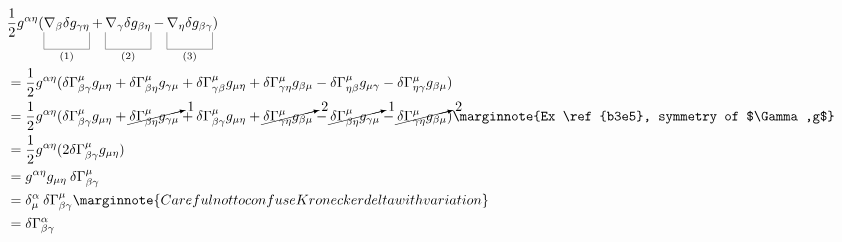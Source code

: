 \documentclass[10pt]{article}
\begin{document}
$$
\begin{aligned}
	&\frac12 g^{\alpha\eta}(\ub{\nabla_\beta \delta g_{\gamma\eta}}{(1)} + \ub{\nabla_\gamma \delta g_{\beta\eta}}{(2)} - \ub{\nabla_\eta \delta g_{\beta\gamma}}{(3)})\\
	&= \frac12 g^{\alpha\eta}(\delta \Gamma_{\beta\gamma}^\mu g_{\mu\eta} + \delta \Gamma_{\beta\eta}^\mu g_{\gamma\mu} + \delta \Gamma_{\gamma\beta}^\mu g_{\mu\eta} + \delta \Gamma_{\gamma\eta}^\mu g_{\beta\mu} - \delta \Gamma_{\eta\beta}^\mu g_{\mu\gamma} - \delta \Gamma_{\eta\gamma}^\mu g_{\beta\mu})\\
	&= \frac12 g^{\alpha\eta}(\delta \Gamma_{\beta\gamma}^\mu g_{\mu\eta} + \cancelto{1}{\delta \Gamma_{\beta\eta}^\mu g_{\gamma\mu}} + \delta \Gamma_{\beta\gamma}^\mu g_{\mu\eta} + \cancelto{2}{\delta \Gamma_{\gamma\eta}^\mu g_{\beta\mu}} - \cancelto{1}{\delta \Gamma_{\beta\eta}^\mu g_{\gamma\mu}} - \cancelto{2}{\delta \Gamma_{\gamma\eta}^\mu g_{\beta\mu}})\marginnote{Ex \ref{b3e5}, symmetry of $\Gamma,g$}\\
	&= \frac12 g^{\alpha\eta}(2\delta \Gamma_{\beta\gamma}^\mu g_{\mu\eta})\\
	&= g^{\alpha\eta}g_{\mu\eta}  \:\delta \Gamma_{\beta\gamma}^\mu\\
	&= \delta^\alpha_\mu  \:\delta\Gamma_{\beta\gamma}^\mu\marginnote{Careful not to confuse Kronecker delta with variation}\\
	&= \delta \Gamma_{\beta\gamma}^\alpha
\end{aligned}
$$
\end{document}
